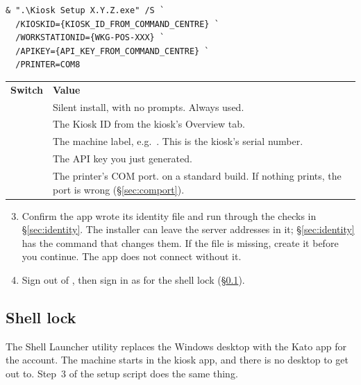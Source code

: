 \documentclass[a4paper,10pt]{article}
\begin{document}
\begin{lstlisting}
& ".\Kiosk Setup X.Y.Z.exe" /S `
  /KIOSKID={KIOSK_ID_FROM_COMMAND_CENTRE} `
  /WORKSTATIONID={WKG-POS-XXX} `
  /APIKEY={API_KEY_FROM_COMMAND_CENTRE} `
  /PRINTER=COM8
\end{lstlisting}

\begin{center}
\renewcommand{\arraystretch}{1.3}\small
\begin{tabularx}{\textwidth}{L{34mm} X}
\color{white}\textbf{Switch} &
\color{white}\textbf{Value}\\
 & Silent install, with no prompts. Always used.\\
 & The Kiosk ID from the kiosk's Overview tab.\\
 & The machine label, e.g.\ .
This is the kiosk's serial number.\\
 & The API key you just generated.\\
 & The printer's COM port.  on a standard
build. If nothing prints, the port is wrong
(\S\ref{sec:comport}).\\
\end{tabularx}
\end{center}

\begin{enumerate}\setcounter{enumi}{2}
  \item Confirm the app wrote its identity file and run through the
        checks in \S\ref{sec:identity}. The installer can leave the
         server addresses in it; \S\ref{sec:identity} has the
        command that changes them. If the file is missing, create it
        before you continue. The app does not connect without it.

  \item Sign out of , then sign in as 
        for the shell lock (\S\ref{sec:lockdown}).
\end{enumerate}

\subsection{Shell lock}\label{sec:lockdown}

The Shell Launcher utility replaces the Windows desktop with the Kato app
for the  account. The machine starts in the kiosk app,
and there is no desktop to get out to. Step~3 of the setup script
does the same thing.
\end{document}
